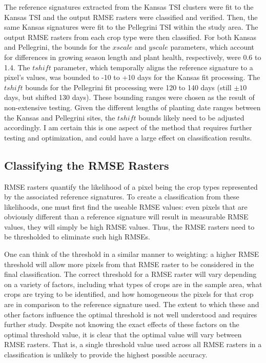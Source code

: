 The reference signatures extracted from the Kansas TSI clusters were fit to the Kansas TSI and the output RMSE rasters were classified and verified. Then, the same Kansas signatures were fit to the Pellegrini TSI within the study area. The output RMSE rasters from each crop type were then classified. For both Kansas and Pellegrini, the bounds for the $xscale$ and $yscale$ parameters, which account for differences in growing season length and plant health, respectively, were 0.6 to 1.4. The $tshift$ parameter, which temporally aligns the reference signature to a pixel's values, was bounded to -10 to +10 days for the Kansas fit processing. The $tshift$ bounds for the Pellegrini fit processing were 120 to 140 days (still $\pm10$ days, but shifted 130 days). These bounding ranges were chosen as the result of non-extensive testing. Given the different lengths of planting date ranges between the Kansas and Pellegrini sites, the $tshift$ bounds likely need to be adjusted accordingly. I am certain this is one aspect of the method that requires further testing and optimization, and could have a large effect on classification results.


\subsection{Classifying the RMSE Rasters}
\label{methods:classification}

RMSE rasters quantify the likelihood of a pixel being the crop types represented by the associated reference signatures. To create a classification from these likelihoods, one must first find the useable RMSE values: even pixels that are obviously different than a reference signature will result in measurable RMSE values, they will simply be high RMSE values. Thus, the RMSE rasters need to be thresholded to eliminate such high RMSEs.

One can think of the threshold in a similar manner to weighting: a higher RMSE threshold will allow more pixels from that RMSE raster to be considered in the final classification. The correct threshold for a RMSE raster will vary depending on a variety of factors, including what types of crops are in the sample area, what crops are trying to be identified, and how homogeneous the pixels for that crop are in comparison to the reference signature used. The extent to which these and other factors influence the optimal threshold is not well understood and requires further study. Despite not knowing the exact effects of these factors on the optimal threshold value, it is clear that the optimal value will vary between RMSE rasters. That is, a single threshold value used across all RMSE rasters in a classification is unlikely to provide the highest possible accuracy.

